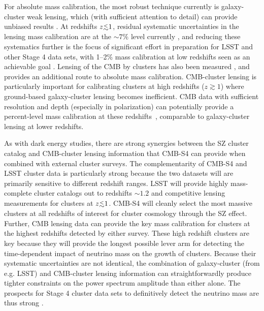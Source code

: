 For absolute mass calibration, the most robust technique currently is galaxy-cluster weak lensing, which (with sufficient attention to detail) can provide unbiased results \cite{Corless:2009hi,Becker:2010xj}. At redshifts $z\lsim1$, residual systematic uncertainties in the lensing mass calibration are at the $\sim7\%$ level currently \cite{Applegate:2012kr}, and reducing these systematics further is the focus of significant effort in preparation for LSST and other Stage 4 data sets, with 1--2\% mass calibration at low redshifts seen as an achievable goal \cite{Abate:2012za}. Lensing of the CMB by clusters has also been measured \cite{Madhavacheril:2014slf,Baxter:2014frs,Melin:2014uaa}, and provides an additional route to absolute mass calibration. CMB-cluster lensing is particularly important for calibrating clusters at high redshifts ($z\gtrsim1$) where ground-based galaxy-cluster lensing becomes inefficient. CMB data with sufficient resolution and depth (especially in polarization) can potentially provide a percent-level mass calibration at these redshifts~\cite{Hu:2007bt}, comparable to galaxy-cluster lensing at lower redshifts.

As with dark energy studies, there are strong synergies between the SZ cluster catalog and CMB-cluster lensing information that CMB-S4 can provide when combined with external cluster surveys. The complementarity of CMB-S4 and LSST cluster data is particularly strong because the two datasets will are primarily sensitive to different redshift ranges. LSST will provide highly mass-complete cluster catalogs out to redshifts $\sim1.2$ and competitive lensing measurements for clusters at $z\lsim 1$. CMB-S4 will cleanly select the most massive clusters at all redshifts of interest for cluster cosmology through the SZ effect. Further, CMB lensing data can provide the key mass calibration for clusters at the highest redshifts detected by either survey. These high redshift clusters are key because they will provide the longest possible lever arm for detecting the time-dependent impact of neutrino mass on the growth of clusters.  Because their systematic uncertainties are not identical, the combination of galaxy-cluster (from e.g. LSST) and CMB-cluster lensing information can straightforwardly produce tighter constraints on the power spectrum amplitude than either alone. The prospects for Stage 4 cluster data sets to definitively detect the neutrino mass are thus strong \cite{Mantz:2014paa,Wang:2005vr}.








